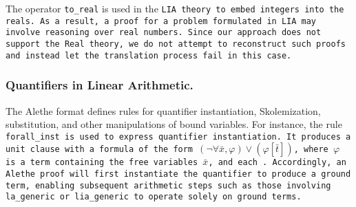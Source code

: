 \begin{remark}
The operator \lstinline[language=SMT,basicstyle=\ttfamily\footnotesize]{to_real} is used in the \tt{LIA} theory to embed integers into the reals.
As a result, a proof for a problem formulated in \tt{LIA} may involve reasoning over real numbers.
Since our approach does not support the \lstinline[language=SMT,basicstyle=\ttfamily\footnotesize\upshape]{Real} theory, we do not attempt to reconstruct such proofs and instead let the translation process fail in this case.
\end{remark}

\subsubsection{Quantifiers in Linear Arithmetic.}

The Alethe format defines rules for quantifier instantiation, Skolemization, substitution, and other manipulations of bound variables.
For instance, the rule \tt{forall\_inst} is used to express quantifier instantiation. It produces a unit clause with a formula of the form $(\neg \forall \bar{x}, \varphi) \lor (\varphi[\bar{t}])$,
where $\varphi$ is a term containing the free variables $\bar{x}$, and each .
Accordingly, an Alethe proof will first instantiate the quantifier to produce a ground term, enabling subsequent arithmetic steps such as those involving \tt{la\_generic} or \tt{lia\_generic} to operate solely on ground terms.
